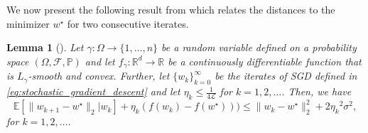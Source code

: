 \documentclass[12pt]{article}
\newtheorem{lemma}[lemma]{Lemma}
\theoremstyle{definition}
\numberwithin{equation}{section}
\newcommand{\R}{\mathbb{R}}
\newcommand{\E}{\mathbb{E}}
\newcommand{\BP}{\mathbb{P}}
\newcommand{\CF}{\mathcal{F}}
\newcommand{\CL}{\mathcal{L}}
\newcommand{\norm}[1]{\lVert{#1}\rVert_2}
\begin{document}
We now present the following result from \autocite{sebbouhAlmostSureConvergence2021} which relates the distances to the minimizer $w^\star$ for two consecutive iterates.
\begin{lemma}[]
  \label{lemma:sgd_iterates}
  Let $\gamma : \Omega \rightarrow \{1,\dots,n\}$ be a random variable defined on a probability space $(\Omega, \CF, \BP)$ and let $f_{\gamma} : \R^d \rightarrow \R$ be a continuously differentiable function that is $L_{\gamma}$-smooth and convex. Further, let $\{w_{k}\}_{k=0}^{\infty}$ be the iterates of SGD defined in \eqref{eq:stochastic_gradient_descent} and let $\eta_k \leq \frac{1}{4 \CL}$ for $k=1,2,\dots$. Then, we have
  \begin{equation*}
    \E[\norm{w_{k+1} - w^\star}|w_k] + \eta_k (f(w_{k}) - f(w^\star))) \leq \norm{w_{k} - w^\star}^2 + 2{\eta_k}^2\sigma^2,
  \end{equation*}
  for $k=1,2,\dots$.
\end{lemma}
\end{document}
